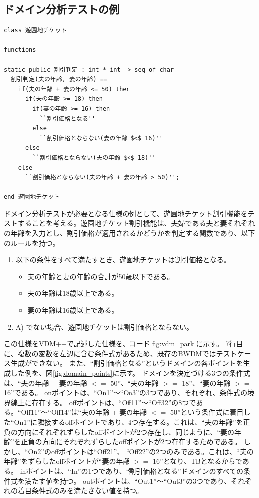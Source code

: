 \documentclass[uplatex, report, a4j, 10pt]{jsbook}
\begin{document}
\subsection{ドメイン分析テストの例}
\lstset{language=}
\noindent\begin{minipage}{\textwidth}
  \begin{lstlisting}[caption=ドメインテストが必要となる仕様(遊園地チケット割引機能),label=fig:vdm_park]
class 遊園地チケット

functions

static public 割引判定 : int * int -> seq of char
  割引判定(夫の年齢, 妻の年齢) ==
    if(夫の年齢 + 妻の年齢 <= 50) then
      if(夫の年齢 >= 18) then
        if(妻の年齢 >= 16) then
          ``割引価格となる''
        else
          ``割引価格とならない(妻の年齢 $<$ 16)''
      else
        ``割引価格とならない(夫の年齢 $<$ 18)''
    else
      ``割引価格とならない(夫の年齢 + 妻の年齢 > 50)'';

end 遊園地チケット
\end{lstlisting}
\end{minipage}

ドメイン分析テストが必要となる仕様の例として、遊園地チケット割引機能をテストすることを考える。遊園地チケット割引機能は、夫婦である夫と妻それぞれの年齢を入力とし、割引価格が適用されるかどうかを判定する関数であり、以下のルールを持つ。
\begin{enumerate}
  \renewcommand{\labelenumi}{\Alph{enumi})}
  \item\label{enu:yuenchi} 以下の条件をすべて満たすとき、遊園地チケットは割引価格となる。
        \begin{itemize}
          \item 夫の年齢と妻の年齢の合計が50歳以下である。
          \item 夫の年齢は18歳以上である。
          \item 妻の年齢は16歳以上である。
        \end{itemize}
  \item A) でない場合、遊園地チケットは割引価格とならない。
\end{enumerate}
この仕様をVDM++で記述した仕様を、コード\ref{fig:vdm_park}に示す。
7行目に、複数の変数を左辺に含む条件式があるため、既存のBWDMではテストケース生成ができない。
また、“割引価格となる”というドメインの各ポイントを生成した例を、図\ref{fig:domain_points}に示す。
ドメインを決定づける3つの条件式は、“夫の年齢 + 妻の年齢 $<=$ 50”、“夫の年齢 $>=$ 18”、“妻の年齢 $>=$ 16”である。
onポイントは、“On1”〜“On3”の3つであり、それぞれ、条件式の境界線上に存在する。
offポイントは、“Off11”〜“Off32”の8つである。“Off11”〜“Off14”は“夫の年齢 + 妻の年齢 $<=$ 50”という条件式に着目した“On1”に隣接するoffポイントであり、4つ存在する。これは、“夫の年齢”を正負の方向にそれぞれずらしたoffポイントが2つ存在し、同じように、“妻の年齢”を正負の方向にそれぞれずらしたoffポイントが2つ存在するためである。
しかし、“On2”のoffポイントは“Off21”、 “Off22”の2つのみである。これは、“夫の年齢”をずらしたoffポイントが“妻の年齢 $>=$ 16”となり、TBとなるからである。
inポイントは、“In”の1つであり、“割引価格となる”ドメインのすべての条件式を満たす値を持つ。
outポイントは、“Out1”〜“Out3”の3つであり、それぞれの着目条件式のみを満たさない値を持つ。
\end{document}
